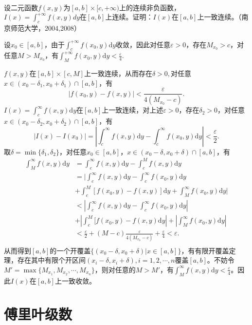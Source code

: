 \begin{exercise}
\hfill\\
  设二元函数$f(x,y)$为$[a,b]\times[c,+\infty)$上的连续非负函数，$I(x)=\int_c^{+\infty}f(x,y)dy$在$[a,b]$上连续。证明：$I(x)$在$[a,b]$上一致连续。（南京师范大学，2004,2008）

设$x_0\in[a,b]$，由于$\int_c^{+\infty}f(x_0,y)\mathrm{d}y$收敛，因此对任意$\varepsilon>0$，存在$M_{x_0}>c$，对任意$M>M_{x_0}$，有$\int_M^{+\infty}f(x_0,y)\mathrm{d}y<\frac{\varepsilon}{4}.$

$f(x,y)$在$[a,b]\times[c,M]$上一致连续，从而存在$\delta>0,$对任意$x\in(x_0-\delta_1,x_0+\delta_1)\cap[a,b]$，有$$|f(x_0,y)-f(x,y)|<\frac{\varepsilon}{4(M_{x_0}-c)}.$$
$I(x)=\int_c^{\infty}f(x,y)\mathrm{d}y$在$[a,b]$上一致连续，对上述$\varepsilon>0$，存在$\delta_2>0$，对任意$x\in(x_0-\delta_2,x_0+\delta_2)\cap[a,b]$，有
$$|I(x)-I(x_0)|=|\int_c^{\infty}f(x,y)\mathrm{d}y-\int_c^{\infty}f(x_0,y)\mathrm{d}y|<\frac{\varepsilon}{2}.$$
取$\delta=\min\{\delta_1,\delta_2\}$，对任意$x_0\in[a,b]$，$x\in(x_0-\delta,x_0+\delta)\cap[a,b]$，有
\begin{align*}
\int_M^{\infty}f(x,y)\mathrm{d}y&=\int_c^{\infty}f(x,y)\mathrm{d}y-\int_c^Mf(x,y)\mathrm{d}y\\
&=|\int_c^{\infty}f(x,y)\mathrm{d}y-\int_c^{\infty}f(x_0,y)\mathrm{d}y\\
&+\int_c^M[f(x_0,y)-f(x,y)]\mathrm{d}y+\int_M^{\infty}f(x_0,y)\mathrm{d}y|\\
&<|\int_c^{\infty}f(x,y)\mathrm{d}y-\int_c^{\infty}f(x_0,y)\mathrm{d}y|\\
&+|\int_c^M[f(x_0,y)-f(x,y)\mathrm{d}y|+|\int_M^{\infty}f(x_0,y)\mathrm{d}y|\\
&<\frac{\varepsilon}{2}+(M-c)\frac{\varepsilon}{4(M_{x_0}-c)}+\frac{\varepsilon}{4}<\varepsilon.\\
\end{align*}
从而得到$[a,b]$的一个开覆盖$\{(x_0-\delta,x_0+\delta)|x\in[a,b]\}$，有有限开覆盖定理，存在其中有限个开区间$(x_i-\delta,x_i+\delta),i=1,2,\cdots,n$覆盖$[a,b]$。不妨令$M'=\max\{M_{x_1},M_{x_2},\cdots,M_{x_n}\}$，则对任意的$M>M'$，有$\int_M^{\infty}f(x,y)\mathrm{d}y<\frac{\varepsilon}{4}$。因此$I(x)$在$[a,b]$上一致收敛。
\end{exercise}

\section{傅里叶级数}

